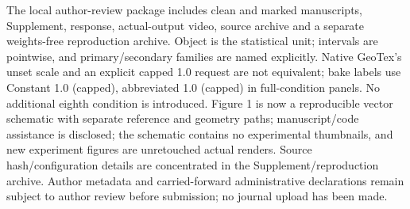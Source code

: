 \documentclass[
  10pt,
]{article}
\begin{document}
The local author-review package includes clean and marked manuscripts,
Supplement, response, actual-output video, source archive and a separate
weights-free reproduction archive. Object is the statistical unit;
intervals are pointwise, and primary/secondary families are named
explicitly. Native GeoTex's unset scale and an explicit capped 1.0
request are not equivalent; bake labels use Constant 1.0 (capped),
abbreviated 1.0 (capped) in full-condition panels. No additional eighth
condition is introduced. Figure 1 is now a reproducible vector schematic
with separate reference and geometry paths; manuscript/code assistance
is disclosed; the schematic contains no experimental thumbnails, and new
experiment figures are unretouched actual renders. Source
hash/configuration details are concentrated in the
Supplement/reproduction archive. Author metadata and carried-forward
administrative declarations remain subject to author review before
submission; no journal upload has been made.
\end{document}
